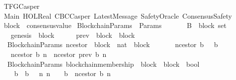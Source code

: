 %
\begin{isabellebody}%
%
%
\isadelimtheory
%
\endisadelimtheory
%
\isatagtheory
{}\isamarkupfalse%
\ TFGCasper\isanewline
\isanewline
{}\ Main\ HOL{\isachardot}Real\ CBCCasper\ LatestMessage\ SafetyOracle\ ConsensusSafety\isanewline
\isanewline
{}%
\endisatagtheory
{\isafoldtheory}%
%
\isadelimtheory
\isanewline
%
\endisadelimtheory
\isanewline
\isanewline
\isanewline
\isanewline
\isanewline
\isanewline
\isanewline
{}\isamarkupfalse%
\ block\ {\isacharequal}\ consensus{\isacharunderscore}value\isanewline
\isanewline
{}\isamarkupfalse%
\ BlockchainParams\ {\isacharequal}\ Params\ {\isacharplus}\isanewline
\ \ \isanewline
\ \ \ B\ {\isacharcolon}{\isacharcolon}\ {\isachardoublequoteopen}block\ set{\isachardoublequoteclose}\isanewline
\ \ \ genesis\ {\isacharcolon}{\isacharcolon}\ block\isanewline
\ \ \isanewline
\ \ \ prev\ {\isacharcolon}{\isacharcolon}\ {\isachardoublequoteopen}block\ {\isasymRightarrow}\ block{\isachardoublequoteclose}\isanewline
\isanewline
\isanewline
{}\isamarkupfalse%
\ {\isacharparenleft}\ BlockchainParams{\isacharparenright}\ n{\isacharunderscore}cestor\ {\isacharcolon}{\isacharcolon}\ {\isachardoublequoteopen}block\ {\isacharasterisk}\ nat\ {\isasymRightarrow}\ block{\isachardoublequoteclose}\isanewline
\ \ \isanewline
\ \ \ \ {\isachardoublequoteopen}n{\isacharunderscore}cestor\ {\isacharparenleft}b{\isacharcomma}\ {}{\isacharparenright}\ {\isacharequal}\ b{\isachardoublequoteclose}\isanewline
\ \ {\isacharbar}\ {\isachardoublequoteopen}n{\isacharunderscore}cestor\ {\isacharparenleft}b{\isacharcomma}\ n{\isacharparenright}\ {\isacharequal}\ n{\isacharunderscore}cestor\ {\isacharparenleft}prev\ b{\isacharcomma}\ n{\isacharminus}{}{\isacharparenright}{\isachardoublequoteclose}\isanewline
\isanewline
\isanewline
{}\isamarkupfalse%
\ {\isacharparenleft}\ BlockchainParams{\isacharparenright}\ blockchain{\isacharunderscore}membership\ {\isacharcolon}{\isacharcolon}\ {\isachardoublequoteopen}block\ {\isasymRightarrow}\ block\ {\isasymRightarrow}\ bool{\isachardoublequoteclose}\ {\isacharparenleft}\ {\isachardoublequoteopen}{\isasymdownharpoonright}{\isachardoublequoteclose}\ {}{}{\isacharparenright}\isanewline
\ \ \isanewline
\ \ \ \ {\isachardoublequoteopen}b{}\ {\isasymdownharpoonright}\ b{}\ {\isacharequal}\ {\isacharparenleft}{\isasymexists}\ n{\isachardot}\ n\ {\isasymin}\ {\isasymnat}\ {\isasymand}\ b{}\ {\isacharequal}\ n{\isacharunderscore}cestor\ {\isacharparenleft}b{}{\isacharcomma}\ n{\isacharparenright}{\isacharparenright}{\isachardoublequoteclose}\isanewline

\end{isabellebody}
